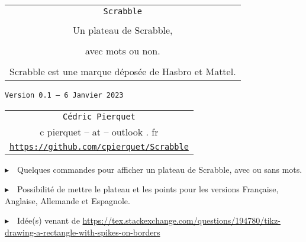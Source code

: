 \documentclass{article}
\def\TPversion{0.1}
\def\TPdate{6 Janvier 2023}
\begin{document}
\pagestyle{fancy}

\thispagestyle{empty}

\vspace{2cm}

\begin{center}
	\begin{minipage}{0.75\linewidth}
	\begin{tcolorbox}[colframe=yellow,colback=yellow!15]
		\begin{center}
			\begin{tabular}{c}
				{\Huge \lstinline!Scrabble!}\\
				\\
				{\LARGE Un plateau de Scrabble,} \\
				\\
				{\LARGE avec mots ou non.} \\
				\\
				{Scrabble\texttrademark{} est une marque déposée de Hasbro\texttrademark{} et Mattel\texttrademark{}.}
			\end{tabular}
			
			\medskip
			
			{\small \texttt{Version \TPversion{} -- \TPdate}}
		\end{center}
	\end{tcolorbox}
\end{minipage}
\end{center}

\vspace{0.5cm}

\begin{center}
	\begin{tabular}{c}
	\texttt{Cédric Pierquet}\\
	{\ttfamily c pierquet -- at -- outlook . fr}\\
	\texttt{\url{https://github.com/cpierquet/Scrabble}}
\end{tabular}
\end{center}

\vspace{0.5cm}

{$\blacktriangleright$~~Quelques commandes pour afficher un plateau de Scrabble, avec ou sans mots.}

\smallskip

{$\blacktriangleright$~~Possibilité de mettre le plateau et les points pour les versions Française, Anglaise, Allemande et Espagnole.}

\smallskip

{$\blacktriangleright$~~Idée(s) venant de \url{https://tex.stackexchange.com/questions/194780/tikz-drawing-a-rectangle-with-spikes-on-borders}}
\end{document}
